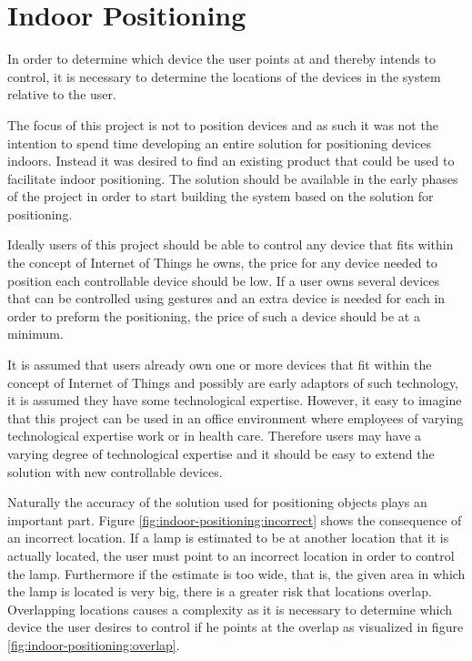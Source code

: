 \section{Indoor Positioning}\label{sec:indoor-positioning}

In order to determine which device the user points at and thereby intends to control, it is necessary to determine the locations of the devices in the system relative to the user.

The focus of this project is not to position devices and as such it was not the intention to spend time developing an entire solution for positioning devices indoors. Instead it was desired to find an existing product that could be used to facilitate indoor positioning.
The solution should be available in the early phases of the project in order to start building the system based on the solution for positioning.

Ideally users of this project should be able to control any device that fits within the concept of Internet of Things he owns, the price for any device needed to position each controllable device should be low. If a user owns several devices that can be controlled using gestures and an extra device is needed for each in order to preform the positioning, the price of such a device should be at a minimum.

It is assumed that users already own one or more devices that fit within the concept of Internet of Things and possibly are early adaptors of such technology, it is assumed they have some technological expertise. However, it easy to imagine that this project can be used in an office environment where employees of varying technological expertise work or in health care. Therefore users may have a varying degree of technological expertise and it should be easy to extend the solution with new controllable devices.

Naturally the accuracy of the solution used for positioning objects plays an important part. Figure \ref{fig:indoor-positioning:incorrect} shows the consequence of an incorrect location. If a lamp is estimated to be at another location that it is actually located, the user must point to an incorrect location in order to control the lamp.
Furthermore if the estimate is too wide, that is, the given area in which the lamp is located is very big, there is a greater risk that locations overlap. Overlapping locations causes a complexity as it is necessary to determine which device the user desires to control if he points at the overlap as visualized in figure \ref{fig:indoor-positioning:overlap}.

